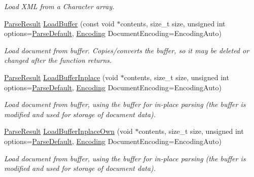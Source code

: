 \begin{DoxyCompactItemize}
\begin{DoxyCompactList}\small\item\em Load XML from a Character array. \item\end{DoxyCompactList}\item 
\hyperlink{structMezzanine_1_1xml_1_1ParseResult}{ParseResult} \hyperlink{classMezzanine_1_1xml_1_1Document_a37117f3f1e6f5a834c638421a3d4b7ec}{LoadBuffer} (const void $\ast$contents, size\_\-t size, unsigned int options=\hyperlink{namespaceMezzanine_1_1xml_a0eb617274d4b3cb604f3120bcdaf9850}{ParseDefault}, \hyperlink{namespaceMezzanine_1_1xml_ab1e7e96991b9c08ac13e797a15253804}{Encoding} DocumentEncoding=EncodingAuto)
\begin{DoxyCompactList}\small\item\em Load document from buffer. Copies/converts the buffer, so it may be deleted or changed after the function returns. \item\end{DoxyCompactList}\item 
\hyperlink{structMezzanine_1_1xml_1_1ParseResult}{ParseResult} \hyperlink{classMezzanine_1_1xml_1_1Document_af53e73f421e6a4ad8655262c377ceb8a}{LoadBufferInplace} (void $\ast$contents, size\_\-t size, unsigned int options=\hyperlink{namespaceMezzanine_1_1xml_a0eb617274d4b3cb604f3120bcdaf9850}{ParseDefault}, \hyperlink{namespaceMezzanine_1_1xml_ab1e7e96991b9c08ac13e797a15253804}{Encoding} DocumentEncoding=EncodingAuto)
\begin{DoxyCompactList}\small\item\em Load document from buffer, using the buffer for in-\/place parsing (the buffer is modified and used for storage of document data). \item\end{DoxyCompactList}\item 
\hyperlink{structMezzanine_1_1xml_1_1ParseResult}{ParseResult} \hyperlink{classMezzanine_1_1xml_1_1Document_ae795eaf8f7985d292f81295c210dbf5d}{LoadBufferInplaceOwn} (void $\ast$contents, size\_\-t size, unsigned int options=\hyperlink{namespaceMezzanine_1_1xml_a0eb617274d4b3cb604f3120bcdaf9850}{ParseDefault}, \hyperlink{namespaceMezzanine_1_1xml_ab1e7e96991b9c08ac13e797a15253804}{Encoding} DocumentEncoding=EncodingAuto)
\begin{DoxyCompactList}\small\item\em Load document from buffer, using the buffer for in-\/place parsing (the buffer is modified and used for storage of document data). \item\end{DoxyCompactList}\item 

\end{DoxyCompactItemize}
